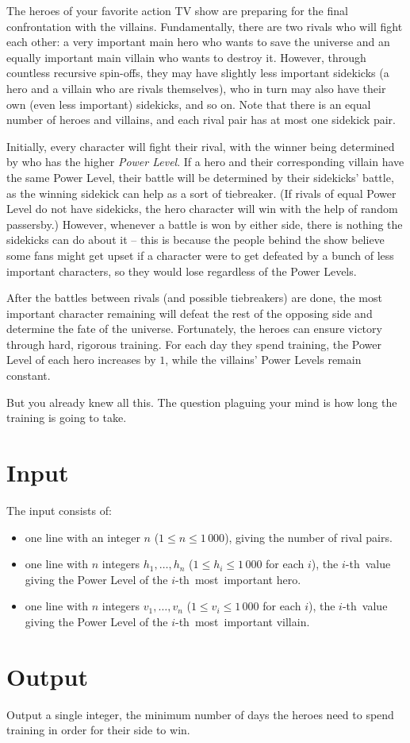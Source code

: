 The heroes of your favorite action TV show are preparing for the final confrontation with the villains.
Fundamentally, there are two rivals who will fight each other: a very important main hero who wants to save the universe and an equally important main villain who wants to destroy it.
However, through countless recursive spin-offs, they may have slightly less important sidekicks (a hero and a villain who are rivals themselves), who in turn may also have their own (even less important) sidekicks, and so on.
Note that there is an equal number of heroes and villains, and each rival pair has at most one sidekick pair.

Initially, every character will fight their rival, with the winner being determined by who has the higher \textit{Power Level}.
If a hero and their corresponding villain have the same Power Level, their battle will be determined by their sidekicks' battle, as the winning sidekick can help as a sort of tiebreaker.
(If rivals of equal Power Level do not have sidekicks, the hero character will win with the help of random passersby.)
However, whenever a battle is won by either side, there is nothing the sidekicks can do about it -- this is because the people behind the show believe some fans might get upset if a character were to get defeated by a bunch of less important characters, so they would lose regardless of the Power Levels.

After the battles between rivals (and possible tiebreakers) are done, the most important character remaining will defeat the rest of the opposing side and determine the fate of the universe.
Fortunately, the heroes can ensure victory through hard, rigorous training.
For each day they spend training, the Power Level of each hero increases by $1$, while the villains' Power Levels remain constant.

But you already knew all this.
The question plaguing your mind is how long the training is going to take.

\section*{Input}
The input consists of:
\begin{itemize}
	\item one line with an integer $n$ ($1 \le n \le 1\,000$), giving the number of rival pairs.
	\item one line with $n$ integers $h_1, \dots, h_n$ ($1 \le h_i \le 1\,000$ for each $i$), the $i$-th~value giving the Power Level of the $i$-th~most~important hero.
	\item one line with $n$ integers $v_1, \dots, v_n$ ($1 \le v_i \le 1\,000$ for each $i$), the $i$-th~value giving the Power Level of the $i$-th~most~important villain.
\end{itemize}

\section*{Output}
Output a single integer, the minimum number of days the heroes need to spend training in order for their side to win.
